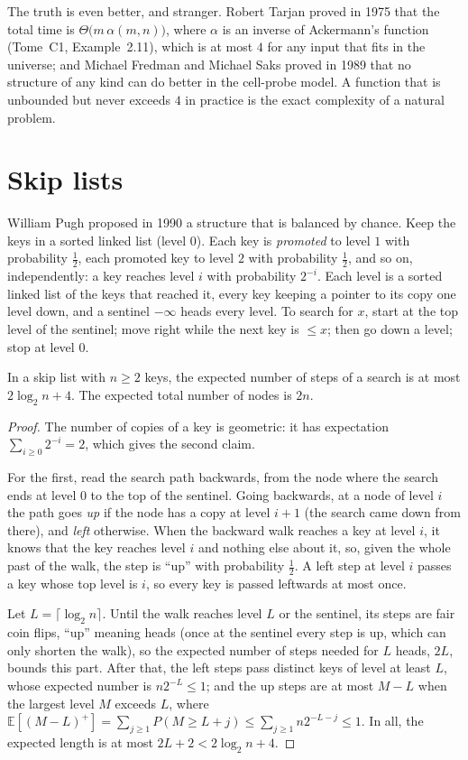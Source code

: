 \begin{remark}
The truth is even better, and stranger. Robert Tarjan proved in 1975 that the total time is $\Theta\bigl(m\,\alpha(m,n)\bigr)$, where $\alpha$ is an inverse of
Ackermann's function (Tome~C1, Example~2.11), which is at most $4$ for any input that fits in the universe; and Michael Fredman and Michael Saks proved in 1989
that no structure of any kind can do better in the cell-probe model. A function that is unbounded but never exceeds $4$ in practice is the exact complexity of
a natural problem.
\end{remark}

\section{Skip lists}\label{sec:skiplists}

William Pugh proposed in 1990 a structure that is balanced by chance. Keep the keys in a sorted linked list (level $0$). Each key is \emph{promoted} to level $1$ with
probability $\frac12$, each promoted key to level $2$ with probability $\frac12$, and so on, independently: a key reaches level $i$ with probability $2^{-i}$. Each level is a sorted
linked list of the keys that reached it, every key keeping a pointer to its copy one level down, and a sentinel $-\infty$ heads every level. To search for $x$, start
at the top level of the sentinel; move right while the next key is $\le x$; then go down a level; stop at level $0$.

\begin{theorem}[Pugh, 1990]\label{thm:skiplist}
In a skip list with $n\ge2$ keys, the expected number of steps of a search is at most $2\log_2n+4$. The expected total number of nodes is $2n$.
\end{theorem}
\begin{proof}
The number of copies of a key is geometric: it has expectation $\sum_{i\ge0}2^{-i}=2$, which gives the second claim.

For the first, read the search path backwards, from the node where the search ends at level $0$ to the top of the sentinel. Going backwards, at a node of level $i$ the path
goes \emph{up} if the node has a copy at level $i+1$ (the search came down from there), and \emph{left} otherwise. When the backward walk reaches a key at level $i$, it knows that the key
reaches level $i$ and nothing else about it, so, given the whole past of the walk, the step is ``up'' with probability $\frac12$. A left step at level $i$ passes a key whose top level is $i$,
so every key is passed leftwards at most once.

Let $L=\lceil\log_2n\rceil$. Until the walk reaches level $L$ or the sentinel, its steps are fair coin flips, ``up'' meaning heads (once at the sentinel every step is up, which can only shorten the walk), so the expected number of steps needed for $L$ heads,
$2L$, bounds this part. After that, the left steps pass distinct keys of level at least $L$, whose expected number is $n2^{-L}\le1$; and the up steps are at most $M-L$ when the largest level
$M$ exceeds $L$, where $\mathbb E[(M-L)^+]=\sum_{j\ge1}P(M\ge L+j)\le\sum_{j\ge1}n2^{-L-j}\le1$. In all, the expected length is at most $2L+2<2\log_2n+4$.
\end{proof}


